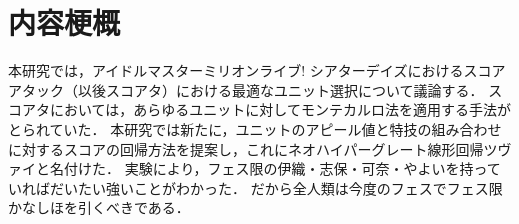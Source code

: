 \section*{内容梗概}

本研究では，アイドルマスターミリオンライブ! シアターデイズにおけるスコアアタック（以後スコアタ）における最適なユニット選択について議論する．
スコアタにおいては，あらゆるユニットに対してモンテカルロ法を適用する手法がとられていた\cite{mirishita-tool}．
本研究では新たに，ユニットのアピール値と特技の組み合わせに対するスコアの回帰方法を提案し，これにネオハイパーグレート線形回帰ツヴァイと名付けた．
実験により，フェス限の伊織・志保・可奈・やよいを持っていればだいたい強いことがわかった．
だから全人類は今度のフェスでフェス限かなしほを引くべきである．
